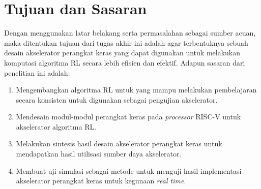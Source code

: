 \section{Tujuan dan Sasaran}

Dengan menggunakan latar belakang serta permasalahan sebagai sumber acuan, maka ditentukan tujuan dari tugas akhir ini adalah agar terbentuknya sebuah desain akselerator perangkat keras yang dapat digunakan untuk melakukan komputasi algoritma RL secara lebih efisien dan efektif. Adapun sasaran dari penelitian ini adalah:

\begin{enumerate}
	\item Mengembangkan algoritma \ac{RL} untuk yang mampu melakukan pembelajaran secara konsisten untuk digunakan sebagai pengujian akselerator.
	\item Mendesain modul-modul perangkat keras pada \textit{processor} RISC-V untuk akselerator algoritma \ac{RL}.
	\item Melakukan sintesis hasil desain akselerator perangkat keras untuk mendapatkan hasil utilisasi sumber daya akselerator.
	\item Membuat uji simulasi sebagai metode untuk menguji hasil implementasi akselerator perangkat keras untuk kegunaan \textit{real time}.
\end{enumerate}
